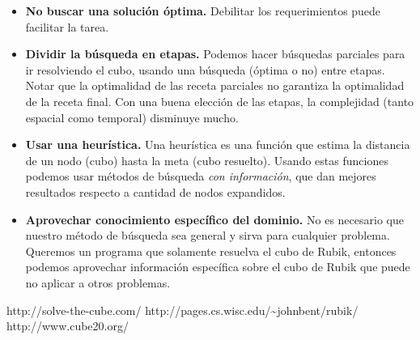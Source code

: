 \documentclass[11pt,a4paper]{article}
\begin{document}
\begin{itemize}
\item \textbf{No buscar una solución óptima.} Debilitar los requerimientos puede facilitar la tarea.
\item \textbf{Dividir la búsqueda en etapas.} Podemos hacer búsquedas parciales para ir resolviendo el cubo, usando una búsqueda (óptima o no) entre etapas. Notar que la optimalidad de las receta parciales no garantiza la optimalidad de la receta final.
Con una buena elección de las etapas, la complejidad (tanto espacial como temporal) disminuye mucho.
\item \textbf{Usar una heurística.} Una heurística es una función que estima la distancia de un nodo (cubo) hasta la meta (cubo resuelto). Usando estas funciones podemos usar métodos de búsqueda \emph{con información}, que dan mejores resultados respecto a cantidad de nodos expandidos.
\item \textbf{Aprovechar conocimiento específico del dominio.} %
No es necesario que nuestro método de búsqueda sea general y sirva para cualquier problema. Queremos un programa que solamente resuelva el cubo de Rubik, entonces podemos aprovechar información específica sobre el cubo de Rubik que puede no aplicar a otros problemas.
\end{itemize}




\begin{thebibliography}{9}

  http://solve-the-cube.com/
  http://pages.cs.wisc.edu/{\textasciitilde}johnbent/rubik/
  http://www.cube20.org/

\end{thebibliography}
\end{document}

